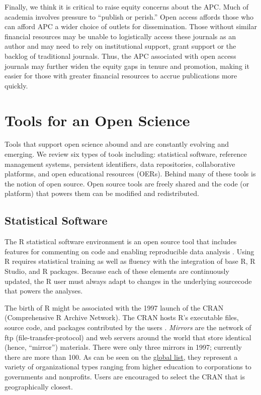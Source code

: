 \documentclass[
  11pt,
]{book}
\begin{document}
Finally, we think it is critical to raise equity concerns about the APC. Much of academia involves pressure to ``publish or perish.'' Open access affords those who can afford APC a wider choice of outlets for dissemination. Those without similar financial resources may be unable to logistically access these journals as an author and may need to rely on institutional support, grant support or the backlog of traditional journals. Thus, the APC associated with open access journals may further widen the equity gaps in tenure and promotion, making it easier for those with greater financial resources to accrue publications more quickly.

\section{Tools for an Open Science}\label{tools-for-an-open-science}

Tools that support open science abound and are constantly evolving and emerging. We review six types of tools including: statistical software, reference management systems, persistent identifiers, data repositories, collaborative platforms, and open educational resources (OERs). Behind many of these tools is the notion of open source. Open source tools are freely shared and the code (or platform) that powers them can be modified and redistributed.

\subsection{Statistical Software}\label{statistical-software}

The R statistical software environment is an open source tool that includes features for commenting on code and enabling reproducible data analysis \citep{alter_responsible_2018, bezjak_open_2018}. Using R requires statistical training as well as fluency with the integration of base R, R Studio, and R packages. Because each of these elements are continuously updated, the R user must always adapt to changes in the underlying sourcecode that powers the analyses.

The birth of R might be associated with the 1997 launch of the CRAN (Comprehensive R Archive Network). The CRAN hosts R's executable files, source code, and packages contributed by the users \citep{noauthor_r_2022}. \emph{Mirrors} are the network of ftp (file-transfer-protocol) and web servers around the world that store identical (hence, ``mirror'') materials. There were only three mirrors in 1997; currently there are more than 100. As can be seen on the \href{https://cran.r-project.org/}{global list}, they represent a variety of organizational types ranging from higher education to corporations to governments and nonprofits. Users are encouraged to select the CRAN that is geographically closest.
\end{document}
